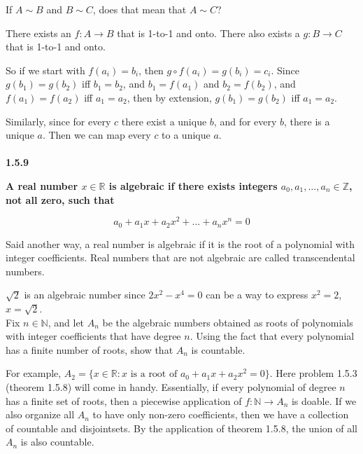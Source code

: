 If $A\sim B$ and $B\sim C$, does that mean that $A\sim C$?

There exists an $f: A\rightarrow B$ that is 1-to-1 and onto.
There also exists a $g: B \rightarrow C$ that is 1-to-1 and onto.

So if we start with $f(a_i) = b_i$, then $g \circ f (a_i) = g(b_i) = c_i$.
Since $g(b_1) = g(b_2)$ iff $b_1 = b_2$, and $b_1 = f(a_1)$ and $b_2 = f(b_2)$, and $f(a_1) = f(a_2)$ iff $a_1 = a_2$,
then by extension, $g(b_1) = g(b_2)$ iff $a_1 = a_2$.

Similarly, since for every $c$ there exist a unique $b$, and for every $b$, there is a unique $a$.
Then we can map every $c$ to a unique $a$.
\\~\\



\textbf{1.5.9}

\textbf{A real number $x\in \mathbb{R}$ is algebraic if there exists integers $a_0, a_1,\dots ,a_n \in \mathbb{Z}$,
not all zero, such that}

\begin{equation}
    a_0 + a_1 x + a_2 x^2 + \ldots + a_n x^n = 0
\end{equation}

Said another way, a real number is algebraic if it is the root of a polynomial with integer coefficients.
Real numbers that are not algebraic are called transcendental numbers.

$\sqrt{2}$ is an algebraic number since $2x^2 - x^4 = 0$ can be a way to express $x^2 = 2$, $x = \sqrt{2}$.
\\

Fix $n \in \mathbb{N}$, and let $A_n$ be the algebraic numbers obtained as roots of polynomials with integer coefficients
that have degree $n$.
Using the fact that every polynomial has a finite number of roots, show that $A_n$ is countable.

For example, $A_2 = \{ x\in\mathbb{R} : \text{$x$ is a root of } a_0 + a_1 x + a_2 x^2 = 0 \}$.
Here problem 1.5.3 (theorem 1.5.8) will come in handy.
Essentially, if every polynomial of degree $n$ has a finite set of roots, then a piecewise application of
$f: \mathbb{N} \rightarrow A_n$ is doable.
If we also organize all $A_n$ to have only non-zero coefficients, then we have a collection of countable and disjointsets.
By the application of theorem 1.5.8, the union of all $A_n$ is also countable.
\\

